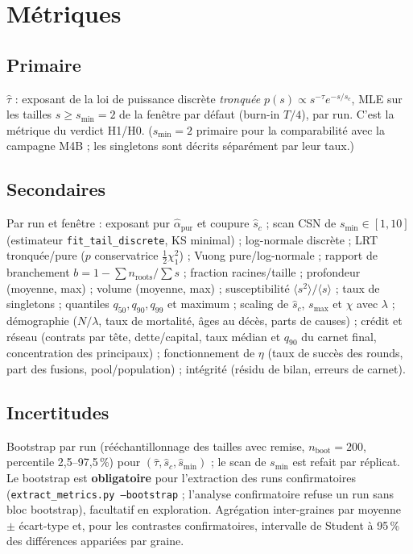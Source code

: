 \documentclass[11pt,a4paper]{article}
\newcommand{\code}[1]{\texttt{#1}}
\begin{document}
\section{Métriques}

\subsection{Primaire}

$\hat\tau$ : exposant de la loi de puissance discrète \emph{tronquée}
$p(s)\propto s^{-\tau}e^{-s/s_c}$, MLE sur les tailles $s\ge s_{\min}=2$
de la fenêtre par défaut (burn-in $T/4$), par run. C'est la métrique du
verdict H1/H0. ($s_{\min}=2$ primaire pour la comparabilité avec la
campagne M4B ; les singletons sont décrits séparément par leur taux.)

\subsection{Secondaires}

Par run et fenêtre : exposant pur $\hat\alpha_{\mathrm{pur}}$ et coupure
$\hat s_c$ ; scan CSN de $s_{\min}\in[1,10]$ (estimateur
\code{fit\_tail\_discrete}, KS minimal) ; log-normale discrète ; LRT
tronquée/pure ($p$ conservatrice $\tfrac12\chi^2_1$) ; Vuong pure/log-normale ;
rapport de branchement $b=1-\sum n_{\mathrm{roots}}/\sum s$ ; fraction
racines/taille ; profondeur (moyenne, max) ; volume (moyenne, max) ;
susceptibilité $\langle s^2\rangle/\langle s\rangle$ ; taux de singletons ;
quantiles $q_{50},q_{90},q_{99}$ et maximum ; scaling de $\hat s_c$,
$s_{\max}$ et $\chi$ avec $\lambda$ ; démographie ($N/\lambda$, taux de
mortalité, âges au décès, parts de causes) ; crédit et réseau (contrats
par tête, dette/capital, taux médian et $q_{90}$ du carnet final,
concentration des principaux) ; fonctionnement de $\eta$ (taux de succès
des rounds, part des fusions, pool/population) ; intégrité (résidu de
bilan, erreurs de carnet).

\subsection{Incertitudes}

Bootstrap par run (rééchantillonnage des tailles avec remise,
$n_{\mathrm{boot}}=200$, percentile 2{,}5--97{,}5\,\%) pour
$(\hat\tau,\hat s_c,\hat s_{\min})$ ; le scan de $s_{\min}$ est refait par
réplicat. Le bootstrap est \textbf{obligatoire} pour l'extraction des
runs confirmatoires (\code{extract\_metrics.py --bootstrap} ; l'analyse
confirmatoire refuse un run sans bloc bootstrap), facultatif en
exploration. Agrégation inter-graines par moyenne $\pm$ écart-type et,
pour les contrastes confirmatoires, intervalle de Student à 95\,\% des
différences appariées par graine.
\end{document}
